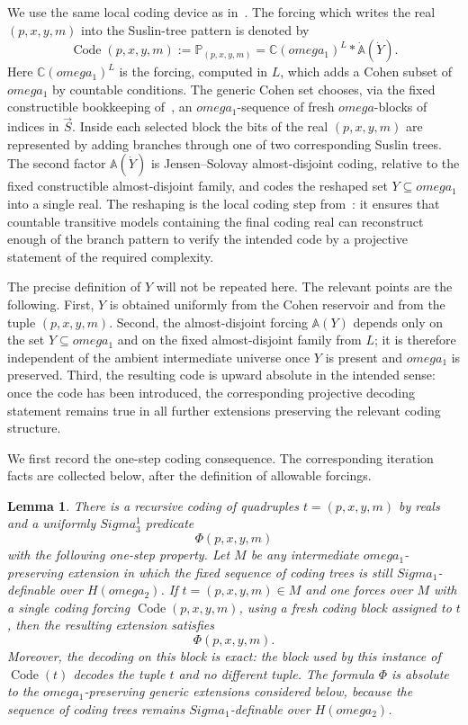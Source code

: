 \documentclass{article}
\newtheorem{lemma}[theorem]{Lemma}
\theoremstyle{remark}
\theoremstyle{plain}
\newcommand{\forceP}{\mathbb{P}}
\newcommand{\Code}{\operatorname{Code}}
\def\mathbf#1{#1}%
\def\Sigma{Sigma}%
\def\omega{omega}%
\begin{document}
We use the same local coding device as in~\cite{HOFFELNER2023103292}. The forcing which writes the real $(p,x,y,m)$ into the Suslin-tree pattern is denoted by
\[
   \Code(p,x,y,m):=\forceP_{(p,x,y,m)}
      =\mathbb C(\omega_1)^L*\dot{\mathbb A}(\dot Y).
\]
Here $\mathbb C(\omega_1)^L$ is the forcing, computed in $L$, which adds a Cohen subset of $\omega_1$ by countable conditions. The generic Cohen set chooses, via the fixed constructible bookkeeping of~\cite{HOFFELNER2023103292}, an $\omega_1$-sequence of fresh $\omega$-blocks of indices in $\vec S$. Inside each selected block the bits of the real $(p,x,y,m)$ are represented by adding branches through one of two corresponding Suslin trees. The second factor $\mathbb A(\dot Y)$ is Jensen--Solovay almost-disjoint coding, relative to the fixed constructible almost-disjoint family, and codes the reshaped set $Y\subseteq\omega_1$ into a single real. The reshaping is the local coding step from~\cite{HOFFELNER2023103292}: it ensures that countable transitive models containing the final coding real can reconstruct enough of the branch pattern to verify the intended code by a projective statement of the required complexity.

The precise definition of $Y$ will not be repeated here. The relevant points are the following. First, $Y$ is obtained uniformly from the Cohen reservoir and from the tuple $(p,x,y,m)$. Second, the almost-disjoint forcing $\mathbb A(Y)$ depends only on the set $Y\subseteq\omega_1$ and on the fixed almost-disjoint family from $L$; it is therefore independent of the ambient intermediate universe once $Y$ is present and $\omega_1$ is preserved. Third, the resulting code is upward absolute in the intended sense: once the code has been introduced, the corresponding projective decoding statement remains true in all further extensions preserving the relevant coding structure.

We first record the one-step coding consequence. The corresponding
iteration facts are collected below, after the definition of allowable forcings.


\begin{lemma}\label{lem:coding}
There is a recursive coding of quadruples $t=(p,x,y,m)$ by reals and a uniformly
$\mathbf{\Sigma}^1_3$ predicate
\[
   \Phi(p,x,y,m)
\]
with the following one-step property. Let $M$ be any intermediate
$\omega_1$-preserving extension in which the fixed sequence of coding trees is
still $\Sigma_1$-definable over $H(\omega_2)$. If $t=(p,x,y,m)\in M$ and one
forces over $M$ with a single coding forcing $\Code(p,x,y,m)$, using a fresh
coding block assigned to $t$, then the resulting extension satisfies
\[
   \Phi(p,x,y,m).
\]
Moreover, the decoding on this block is exact: the block used by this instance
of $\Code(t)$ decodes the tuple $t$ and no different tuple. The formula
$\Phi$ is absolute to the $\omega_1$-preserving generic extensions considered
below, because the sequence of coding trees remains $\Sigma_1$-definable over
$H(\omega_2)$.
\end{lemma}
\end{document}
